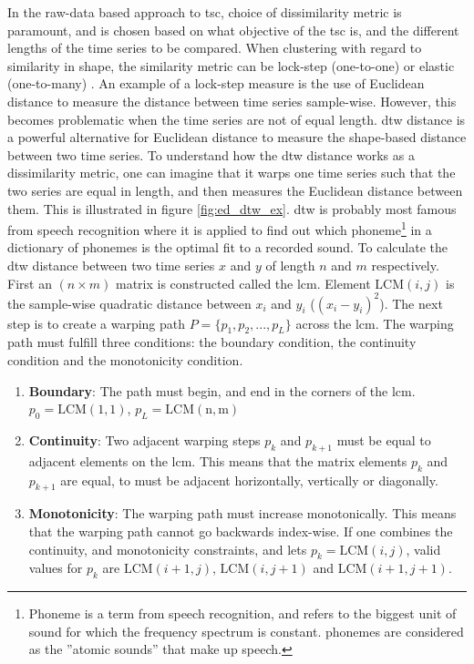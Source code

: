 In the raw-data based approach to \acrshort{tsc}, choice of dissimilarity metric is paramount, and is chosen based on what objective of the \acrshort{tsc} is, and the different lengths of the time series to be compared. When clustering with regard to similarity in shape, the similarity metric can be lock-step (one-to-one) or elastic (one-to-many) \cite{tsc_rev}. An example of a lock-step measure is the use of Euclidean distance to measure the distance between time series sample-wise. However, this becomes problematic when the time series are not of equal length. \acrfull{dtw} distance is a powerful alternative for Euclidean distance to measure the shape-based distance between two time series. To understand how the \acrshort{dtw} distance works as a dissimilarity metric, one can imagine that it warps one time series such that the two series are equal in length, and then measures the Euclidean distance between them. This is illustrated in figure \ref{fig:ed_dtw_ex}. \acrshort{dtw} is probably most famous from speech recognition where it is applied to find out which phoneme\footnote{Phoneme is a term from speech recognition, and refers to the biggest unit of sound for which the frequency spectrum is constant. phonemes are considered as the ''atomic sounds'' that make up speech.} in a dictionary of phonemes is the optimal fit to a recorded sound. To calculate the \acrshort{dtw} distance between two time series $x$ and $y$ of length $n$ and $m$ respectively. First an $(n \times m)$ matrix is constructed called the \acrfull{lcm}. Element $\mathrm{LCM}(i,j)$ is the sample-wise quadratic distance between $x_i$ and $y_i$ ($(x_i - y_i)^2$). The next step is to create a warping path $P = \{p_1, p_2, ..., p_L\}$ across the \acrshort{lcm}. The warping path must fulfill three conditions: the boundary condition, the continuity condition and the monotonicity condition. 

\begin{enumerate} 
    \item \textbf{Boundary}: The path must begin, and end in the corners of the \acrshort{lcm}. $p_0 = \mathrm{LCM(1,1)}$, $p_L = \mathrm{LCM(n,m)}$ 
    \item \textbf{Continuity}: Two adjacent warping steps $p_k$ and $p_{k+1}$ must be equal to adjacent elements on the \acrshort{lcm}. This means that the matrix elements $p_k$ and $p_{k+1}$ are equal, to must be adjacent horizontally, vertically or diagonally.
    \item \textbf{Monotonicity}: The warping path must increase monotonically. This means that the warping path cannot go backwards index-wise. If one combines the continuity, and monotonicity constraints, and lets $p_k = \mathrm{LCM}(i,j)$, valid values for $p_k$ are $\mathrm{LCM}(i+1,j)$, $\mathrm{LCM}(i,j+1)$ and $\mathrm{LCM}(i+1,j+1)$.
\end{enumerate}

